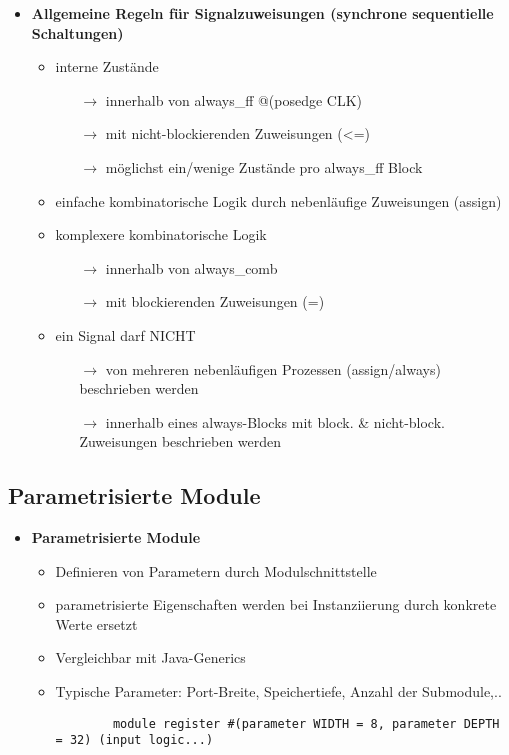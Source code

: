 \begin{itemize}
\begin{itemize}
	\end{itemize}
	
\item \textbf{Allgemeine Regeln für Signalzuweisungen (synchrone sequentielle Schaltungen)}
	\begin{itemize}
	\item interne Zustände
		\begin{itemize}
		\item[$\rightarrow$] innerhalb von always\_ff @(posedge CLK)
		\item[$\rightarrow$] mit nicht-blockierenden Zuweisungen (<=)
		\item[$\rightarrow$] möglichst ein/wenige Zustände pro always\_ff Block
		\end{itemize}
	\item einfache kombinatorische Logik durch nebenläufige Zuweisungen (assign)
	\item komplexere kombinatorische Logik
		\begin{itemize}
		\item[$\rightarrow$] innerhalb von always\_comb
		\item[$\rightarrow$] mit blockierenden Zuweisungen (=)
		\end{itemize}		
	\item ein Signal darf NICHT
		\begin{itemize}
		\item[$\rightarrow$] von mehreren nebenläufigen Prozessen (assign/always) beschrieben werden
		\item[$\rightarrow$] innerhalb eines always-Blocks mit block. \& nicht-block. Zuweisungen beschrieben werden
		\end{itemize}
			
	\end{itemize}

\end{itemize}

\subsection{Parametrisierte Module}
\begin{itemize}

\item \textbf{Parametrisierte Module}
	\begin{itemize}
	\item Definieren von Parametern durch Modulschnittstelle
	\item parametrisierte Eigenschaften werden bei Instanziierung durch konkrete Werte ersetzt
	\item Vergleichbar mit Java-Generics
	\item Typische Parameter: Port-Breite, Speichertiefe, Anzahl der Submodule,..
	\item[]
		\begin{lstlisting}
		module register #(parameter WIDTH = 8, parameter DEPTH = 32) (input logic...)
		\end{lstlisting}
	\end{itemize}

\end{itemize}


